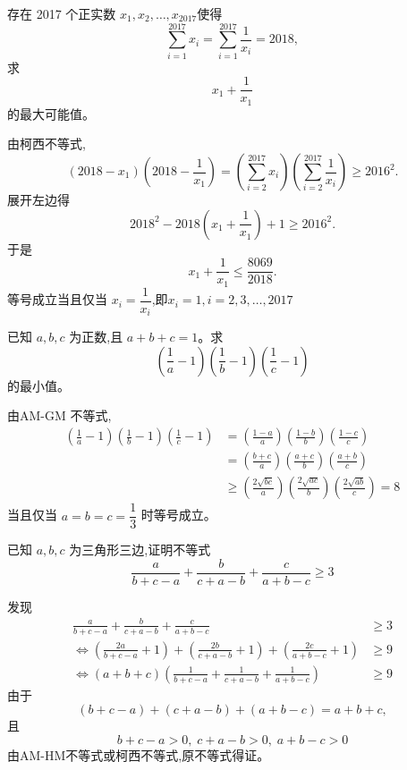 \begin{questions}
    \question 存在 2017 个正实数 \( x_1, x_2, \ldots, x_{2017} \)使得
    \[
    \sum_{i=1}^{2017} x_i = \sum_{i=1}^{2017} \frac{1}{x_i} = 2018,
    \]
    求
    \[
    x_1 + \frac{1}{x_1}
    \]
    的最大可能值。
    \begin{solution}
        由柯西不等式,
        \[
        (2018 - x_1)\left(2018 - \frac{1}{x_1} \right)=\left(\sum_{i=2}^{2017} x_i\right)\left(\sum_{i=2}^{2017} \frac{1}{x_i}\right)  \geq 2016^2.
        \]
        展开左边得
        \[
        2018^2 - 2018\left(x_1 + \frac{1}{x_1} \right) + 1 \geq 2016^2.
        \]
        于是
        \[
        x_1 + \frac{1}{x_1} \leq \frac{8069}{2018}.
        \]
        等号成立当且仅当 $x_i = \dfrac{1}{x_i}$,即$x_i=1,i=2,3,\dots,2017$
    \end{solution}

    \question 已知 $a, b, c$ 为正数,且 $a+b+c=1$。求 $$ \left(\frac{1}{a}-1\right)\left(\frac{1}{b}-1\right)\left(\frac{1}{c}-1\right)$$ 的最小值。
    \begin{solution}
    由AM-GM 不等式,
        \begin{align*}
        \left(\frac{1}{a}-1\right)\left(\frac{1}{b}-1\right)\left(\frac{1}{c}-1\right)
        &= \left(\frac{1-a}{a}\right)\left(\frac{1-b}{b}\right)\left(\frac{1-c}{c}\right)\\[1mm]
        &= \left(\frac{b+c}{a}\right)\left(\frac{a+c}{b}\right)\left(\frac{a+b}{c}\right)\\[1mm]
        &\ge \left(\frac{2\sqrt{bc}}{a}\right)\left(\frac{2\sqrt{ac}}{b}\right)\left(\frac{2\sqrt{ab}}{c}\right) =8 
        \end{align*}
        当且仅当 $a=b=c=\dfrac{1}{3}$ 时等号成立。
    \end{solution}

    \question 已知 $a,b,c$ 为三角形三边,证明不等式
    \[
    \frac{a}{b+c-a} + \frac{b}{c+a-b} + \frac{c}{a+b-c} \ge 3
    \]
    \begin{solution}
        发现
        \begin{align*}
        \frac{a}{b+c-a} + \frac{b}{c+a-b} + \frac{c}{a+b-c} &\ge 3 \\
        \iff \left(\frac{2a}{b+c-a}+1\right) + \left(\frac{2b}{c+a-b}+1\right) + \left(\frac{2c}{a+b-c}+1\right) &\ge 9 \\
        \iff (a+b+c) \left(\frac{1}{b+c-a} + \frac{1}{c+a-b} + \frac{1}{a+b-c}\right) &\ge 9
        \end{align*}
        由于 
        \[
        (b+c-a)+(c+a-b)+(a+b-c) = a+b+c,
        \]
        且
        \[
        b+c-a>0,\;c+a-b>0,\;a+b-c>0
        \]
        由AM-HM不等式或柯西不等式,原不等式得证。
    \end{solution}


\end{questions}
